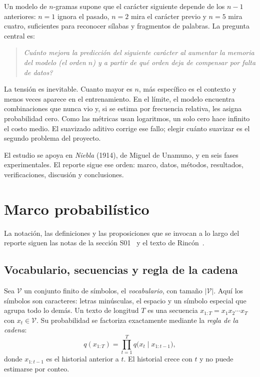 \documentclass[11pt,letterpaper]{article}
\begin{document}
Un modelo de $n$-gramas supone que el carácter siguiente depende de los $n-1$ anteriores: $n=1$ ignora el pasado, $n=2$ mira el carácter previo y $n=5$ mira cuatro, suficientes para reconocer sílabas y fragmentos de palabras. La pregunta central es:

\begin{quote}
\centering
\itshape
\textquestiondown{}Cuánto mejora la predicción del siguiente carácter al aumentar la memoria del modelo (el orden $n$) y a partir de qué orden deja de compensar por falta de datos?
\end{quote}

La tensión es inevitable. Cuanto mayor es $n$, más específico es el contexto y menos veces aparece en el entrenamiento. En el límite, el modelo encuentra combinaciones que nunca vio y, si se estima por frecuencia relativa, les asigna probabilidad cero. Como las métricas usan logaritmos, un solo cero hace infinito el costo medio. El suavizado aditivo corrige ese fallo; elegir cuánto suavizar es el segundo problema del proyecto.

El estudio se apoya en \emph{Niebla} (1914), de Miguel de Unamuno, y en seis fases experimentales. El reporte sigue ese orden: marco, datos, métodos, resultados, verificaciones, discusión y conclusiones.

\section{Marco probabilístico}\label{sec:marco}

La notación, las definiciones y las proposiciones que se invocan a lo largo del reporte siguen las notas de la sección S01~\cite{marcano} y el texto de Rincón~\cite{rincon}.

\subsection{Vocabulario, secuencias y regla de la cadena}

Sea $\mathcal{V}$ un conjunto finito de símbolos, el \emph{vocabulario}, con tamaño $|\mathcal{V}|$. Aquí los símbolos son caracteres: letras minúsculas, el espacio y un símbolo especial que agrupa todo lo demás. Un texto de longitud $T$ es una secuencia $x_{1:T}=x_1x_2\cdots x_T$ con $x_t\in\mathcal{V}$. Su probabilidad se factoriza exactamente mediante la \emph{regla de la cadena}:
\begin{equation}\label{eq:cadena}
q(x_{1:T})=\prod_{t=1}^{T} q\bigl(x_t\mid x_{1:t-1}\bigr),
\end{equation}
donde $x_{1:t-1}$ es el historial anterior a $t$. El historial crece con $t$ y no puede estimarse por conteo.
\end{document}
